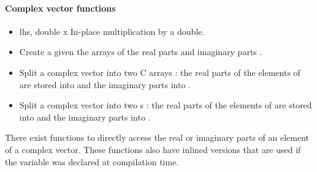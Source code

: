 \paragraph{Complex vector functions}

\begin{itemize}
\item {}
  { \ptr lhs, double x}
  \sshortdescribe In-place multiplication by a double.

\item {}
  \sshortdescribe Create a  given the arrays of the
  real parts  and imaginary parts .
\item {}
    \sshortdescribe Split a complex vector into two C arrays : the
    real parts of the elements of  are stored into  and the
    imaginary parts into .
\item {}
  \sshortdescribe Split a complex vector into two s : the
  real parts of the elements of  are stored into  and the
imaginary parts into .
\end{itemize}

There exist functions to directly access the real or imaginary parts of an
element of a complex vector. These functions also have inlined versions that
are used if the variable  was declared at compilation time.

